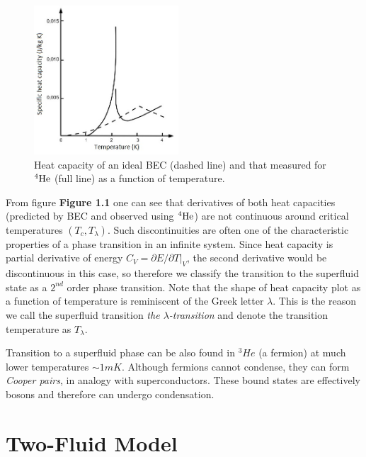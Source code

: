 \begin{figure}
\vspace{-0.7cm}
\centering
\includegraphics[width=0.48\textwidth]{graphics/capacity_bec}
\caption{Heat capacity of an ideal BEC (dashed line) and that measured for ${}^4\mathrm{He}$ (full line) as a function of temperature.}
\vspace{-0.5cm}
\end{figure}
From figure {\sffamily\textbf{Figure 1.1}} one can see that derivatives of both heat capacities (predicted by BEC and observed using $ {}^4\mathrm{He} $) are not continuous around critical temperatures $(T_c, T_{\lambda})$. Such discontinuities are often one of the characteristic properties of a phase transition in an infinite system. Since heat capacity is partial derivative of energy $ C_V = \partial E /\partial T \big\vert_V $, the second derivative would be discontinuous in this case, so therefore we classify the transition to the superfluid state as a $2^{\unit{nd}}$ order phase transition. Note that the shape of heat capacity plot as a function of temperature is reminiscent of the Greek letter $ \lambda $. This is the reason we call the superfluid transition   \textit{the $ \lambda$-transition} and denote the transition temperature as $ T_{\lambda}$. 

Transition to a superfluid phase can be also found in ${}^3\!\unit{He}$ (a fermion) at much lower temperatures $ \sim 1 \unit{mK} $. Although fermions cannot condense, they can form \textit{Cooper pairs}, in analogy with superconductors. These bound states are effectively bosons and therefore can undergo condensation.






\section{Two-Fluid Model}

